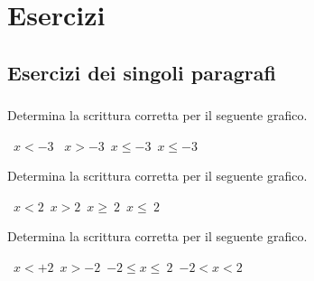 
\section{Esercizi}

\subsection{Esercizi dei singoli paragrafi}

\subsubsection*{}

\begin{esercizio}
 \label{ese:21.1}
 Determina la scrittura corretta per il seguente grafico.
 \begin{center}
  

 \boxA\quad~$x<-3$ \quad\boxB\quad~$x>-3$\quad\boxC\quad~$x\le -3$\quad\boxD\quad~$x\le -3$
 \end{center}

\end{esercizio}

\begin{esercizio}
 \label{ese:21.2}
 Determina la scrittura corretta per il seguente grafico.
  \begin{center}
  

\boxA\quad~$x<2$\quad\boxB\quad~$x>2$\quad\boxC\quad~$x\ge~2$\quad\boxD\quad~$x\le~2$
 \end{center}
\end{esercizio}

\begin{esercizio}
 \label{ese:21.3}
 Determina la scrittura corretta per il seguente grafico.
  \begin{center}
  

\boxA\quad~$x<+2$\quad\boxB\quad~$x>-2$\quad\boxC\quad~$-2\le x\le~2$\quad\boxD\quad~$-2<x<2$
 \end{center}
\end{esercizio}

